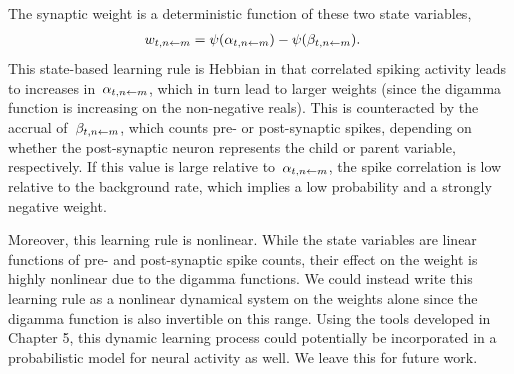The synaptic weight is a deterministic function of these two state variables,
\begin{align}
  w_{t, n \leftarrow m} &= \psi(\alpha_{t, n \leftarrow m}) - \psi(\beta_{t, n \leftarrow m}).
\end{align}
This state-based learning rule is Hebbian in that correlated spiking
activity leads to increases in~$\alpha_{t,n\leftarrow m}$, which in turn
lead to larger weights (since the digamma function is increasing on
the non-negative reals).
This is counteracted by the accrual of~$\beta_{t, n \leftarrow m}$, which
counts pre- or post-synaptic spikes, depending on whether the
post-synaptic neuron represents the child or parent variable, respectively.
If this value is large relative to~$\alpha_{t, n \leftarrow m}$, the
spike correlation is low relative to the background rate, which
implies a low probability and a strongly negative weight. 

Moreover, this learning rule is nonlinear. While the state variables
are linear functions of pre- and post-synaptic spike counts, their
effect on the weight is highly nonlinear due to the digamma functions.
We could instead write this learning rule as a nonlinear dynamical
system on the weights alone since the digamma function is also
invertible on this range. Using the tools developed in Chapter 5, this
dynamic learning process could potentially be incorporated in a
probabilistic model for neural activity as well.  We leave this for
future work.

